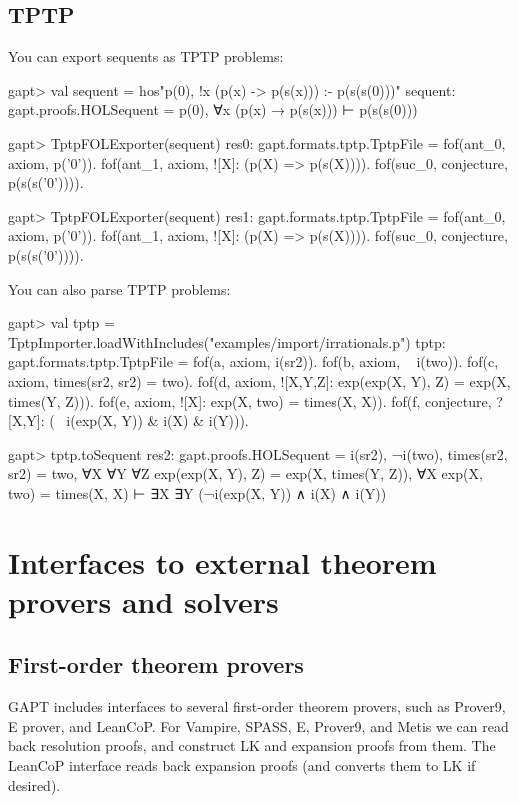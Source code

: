 \documentclass[a4paper,11pt]{book}
\begin{document}
\section{TPTP}
You can export sequents as TPTP problems:
\begin{clilisting}
gapt> val sequent = hos"p(0), !x (p(x) -> p(s(x))) :- p(s(s(0)))"
sequent: gapt.proofs.HOLSequent = p(0), ∀x (p(x) → p(s(x))) ⊢ p(s(s(0)))

gapt> TptpFOLExporter(sequent)
res0: gapt.formats.tptp.TptpFile =
fof(ant_0, axiom, p('0')).
fof(ant_1, axiom, ![X]: (p(X) => p(s(X)))).
fof(suc_0, conjecture, p(s(s('0')))).

gapt> TptpFOLExporter(sequent)
res1: gapt.formats.tptp.TptpFile =
fof(ant_0, axiom, p('0')).
fof(ant_1, axiom, ![X]: (p(X) => p(s(X)))).
fof(suc_0, conjecture, p(s(s('0')))).

\end{clilisting}

You can also parse TPTP problems:
\begin{clilisting}
gapt> val tptp = TptpImporter.loadWithIncludes("examples/import/irrationals.p")
tptp: gapt.formats.tptp.TptpFile =
fof(a, axiom, i(sr2)).
fof(b, axiom, ~ i(two)).
fof(c, axiom, times(sr2, sr2) = two).
fof(d, axiom, ![X,Y,Z]: exp(exp(X, Y), Z) = exp(X, times(Y, Z))).
fof(e, axiom, ![X]: exp(X, two) = times(X, X)).
fof(f, conjecture, ?[X,Y]: (~ i(exp(X, Y)) & i(X) & i(Y))).

gapt> tptp.toSequent
res2: gapt.proofs.HOLSequent =
i(sr2),
¬i(two),
times(sr2, sr2) = two,
∀X ∀Y ∀Z exp(exp(X, Y), Z) = exp(X, times(Y, Z)),
∀X exp(X, two) = times(X, X)
⊢
∃X ∃Y (¬i(exp(X, Y)) ∧ i(X) ∧ i(Y))

\end{clilisting}

\chapter{Interfaces to external theorem provers and solvers}


\section{First-order theorem provers}\label{sec:fol_provers}

GAPT includes interfaces to several first-order theorem provers, such as
Prover9, E prover, and LeanCoP.  For Vampire, SPASS, E, Prover9, and Metis we can read back
resolution proofs, and construct LK and expansion proofs from them.  The
LeanCoP interface reads back expansion proofs (and converts them to LK if desired).
\end{document}
